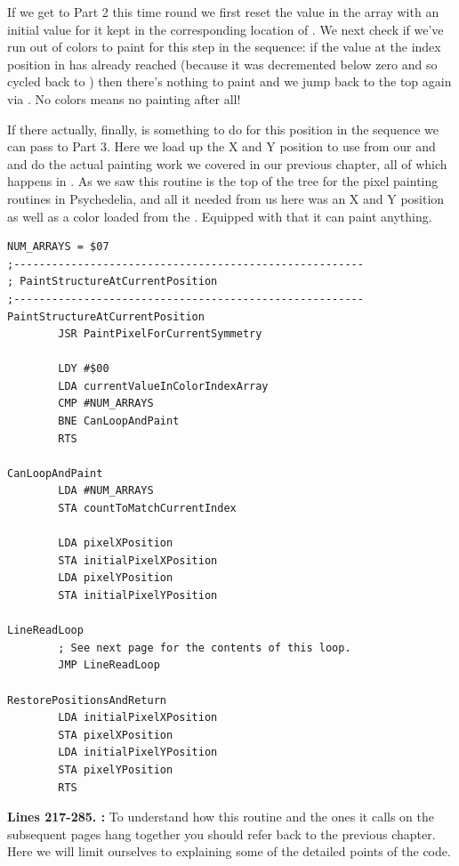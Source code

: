 If we get to Part 2 this time round we first reset the value in the  array with an initial value for it kept in the corresponding
location of . We next check if we've run out of colors to paint for this step
in the sequence: if the value at the index position in  has already reached  (because
it was decremented below zero and so cycled back to ) then there's nothing to paint and we jump back to the top
again via . No colors means no painting after all!

If there actually, finally, is something to do for this position in the sequence we can pass to Part 3. Here we load up the X and Y
position to use from our  and  and do the actual painting work we covered
in our previous chapter, all of which happens in . As we saw this routine is the top of the
tree for the pixel painting routines in Psychedelia, and all it needed from us here was an X and Y position as well as a color
loaded from the . Equipped with that it can paint anything. 

\clearpage
\begin{lstlisting}
NUM_ARRAYS = $07
;-------------------------------------------------------
; PaintStructureAtCurrentPosition
;-------------------------------------------------------
PaintStructureAtCurrentPosition   
        JSR PaintPixelForCurrentSymmetry

        LDY #$00
        LDA currentValueInColorIndexArray
        CMP #NUM_ARRAYS
        BNE CanLoopAndPaint
        RTS 

CanLoopAndPaint   
        LDA #NUM_ARRAYS
        STA countToMatchCurrentIndex
       
        LDA pixelXPosition
        STA initialPixelXPosition
        LDA pixelYPosition
        STA initialPixelYPosition

LineReadLoop   
        ; See next page for the contents of this loop.
        JMP LineReadLoop

RestorePositionsAndReturn   
        LDA initialPixelXPosition
        STA pixelXPosition
        LDA initialPixelYPosition
        STA pixelYPosition
        RTS 

\end{lstlisting}
\clearpage

\textbf{Lines 217-285. :} To understand how this routine and the ones it calls on the subsequent pages hang together you should refer
back to the previous chapter. Here we will limit ourselves to explaining some of the detailed points of the
code.

